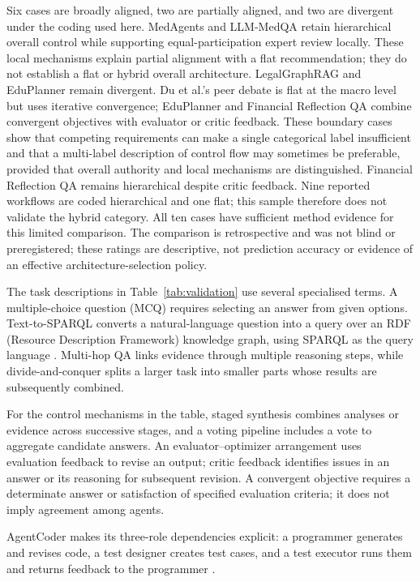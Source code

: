\documentclass[a4paper,fleqn]{cas-dc}
\begin{document}
Six cases are broadly aligned, two are partially aligned, and two are
divergent under the coding used here. MedAgents and LLM-MedQA retain
hierarchical overall control while supporting equal-participation expert
review locally. These local mechanisms explain partial alignment with a
flat recommendation; they do not establish a flat or hybrid overall
architecture. LegalGraphRAG and EduPlanner remain divergent. Du et al.'s
peer debate is flat at the macro level but uses iterative convergence;
EduPlanner and Financial Reflection QA combine convergent objectives with
evaluator or critic feedback. These boundary cases show that competing
requirements can make a single categorical label insufficient and that a
multi-label description of control flow may sometimes be preferable,
provided that overall authority and local mechanisms are distinguished.
Financial Reflection QA remains hierarchical despite critic feedback.
Nine reported workflows
are coded hierarchical and one flat; this sample therefore does not validate
the hybrid category. All ten cases have sufficient method evidence for this
limited comparison. The comparison is retrospective and was not blind or
preregistered; these ratings are descriptive, not prediction accuracy or
evidence of an effective architecture-selection policy.

The task descriptions in Table~\ref{tab:validation} use several specialised
terms. A multiple-choice question (MCQ) requires selecting an answer from
given options. Text-to-SPARQL converts a natural-language question into a
query over an RDF (Resource Description Framework) knowledge graph, using
SPARQL as the query language \citep{hu2024triad}. Multi-hop QA links evidence
through multiple reasoning steps, while divide-and-conquer splits a larger
task into smaller parts whose results are subsequently combined.

For the control mechanisms in the table, staged synthesis combines analyses
or evidence across successive stages, and a voting pipeline includes a vote
to aggregate candidate answers. An evaluator--optimizer arrangement uses
evaluation feedback to revise an output; critic feedback identifies issues
in an answer or its reasoning for subsequent revision. A convergent objective
requires a determinate answer or satisfaction of specified evaluation
criteria; it does not imply agreement among agents.

AgentCoder makes its three-role dependencies explicit: a programmer generates
and revises code, a test designer creates test cases, and a test executor
runs them and returns feedback to the programmer
\citep{huang2023agentcoder}.
\end{document}
